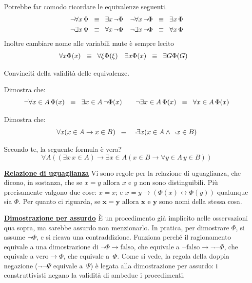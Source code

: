 Potrebbe far comodo ricordare le equivalenze seguenti.
\begin{align*}
\neg\forall x \, \Phi &\;\;\equiv\;\; \exists x \, \neg\Phi & \neg\forall x \,
\neg \Phi &\;\;\equiv\;\; \exists x \, \Phi\\
\neg\exists x \, \Phi &\;\;\equiv\;\; \forall x \, \neg \Phi & \neg \exists x \,
\neg \Phi &\;\;\equiv\;\; \forall x \, \Phi
\end{align*}
Inoltre cambiare nome alle variabili mute \`e sempre lecito
\begin{align*}
\forall x \Phi(x) &\;\;\equiv\;\; \forall \xi \Phi(\xi) & \exists x \Phi(x)
&\;\;\equiv\;\; \exists G \Phi(G)
\end{align*}

\begin{exercise}
Convinciti della validit\`a delle equivalenze.
\end{exercise}

\begin{exercise}
Dimostra che:
\[ \neg \forall x \in A \, \Phi(x) \;\;\equiv\;\; \exists x \in A \, \neg \Phi(x)
\qquad \neg \exists x \in A \, \Phi(x) \;\;\equiv\;\; \forall x \in A \, \Phi(x)
	\]
\end{exercise}

\begin{exercise}
Dimostra che:
\[ \forall x (x \in A \rightarrow x \in B) \;\;\equiv\;\; \neg \exists x (x \in A \land \neg x \in B)
	\]
\end{exercise}

\begin{exercise}
Secondo te, la seguente formula \`e vera?
\[ \forall A ((\exists x \, x \in A) \rightarrow \exists x \in A (x \in B \rightarrow \forall y \in A \, y \in B))
	\]
\end{exercise}

\textbf{\underline{Relazione di uguaglianza}}
Vi sono regole per la relazione di uguaglianza, che dicono, in sostanza,
che se $x = y$ allora $x$ e $y$ non sono distinguibili. Pi\`u precisamente
valgono due cose: $x = x$; e $x = y \rightarrow (\Phi(x)
\leftrightarrow \Phi(y))$ qualunque sia $\Phi$.
Per quanto ci riguarda, {\drkred se $\mathbf{x = y}$ allora $\mathbf x$ e
$\mathbf y$ sono nomi della stessa cosa.}

\textbf{\underline{Dimostrazione per assurdo}}
\`E un procedimento gi\`a implicito nelle osservazioni qua sopra, ma sarebbe
assurdo non menzionarlo. In pratica, per dimostrare {\drkred $\Phi$}, si assume
{\drkblu $\neg\Phi$}, e si ricava una contraddizione. Funziona perch\'e il
ragionamento equivale a una dimostrazione di {\drkred $\neg\Phi\rightarrow
\text{falso}$,} che equivale a
{\drkred $\neg\text{falso} \rightarrow \neg\neg\Phi$,} che equivale a
{\drkred $\text{vero}\rightarrow\Phi$,} che equivale a~{\drkred $\Phi$.}
Come si vede, la regola della doppia negazione ($\neg\neg\Psi$
equivale a~$\Psi$) \`e legata alla dimostrazione per assurdo: i
construttivisti negano la validit\`a di ambedue i procedimenti.

